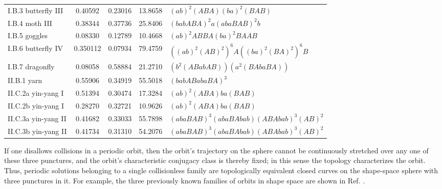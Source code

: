 \documentclass[twocolumn,showpacs,showkeys,preprintnumbers,amsmath,amssymb]{revtex4}
\begin{document}
\begin{table}[tbh]
\begin{center}
\begin{tabular}{lc@{\hskip 0.1in}c@{\hskip 0.1in}c@{\hskip 0.1in}l}
I.B.3 butterfly III & 0.40592 & 0.23016 & 13.8658 & $(ab)^2(ABA)(ba)^2(BAB)$ \\ %
I.B.4 moth III & 0.38344 & 0.37736 & 25.8406 & $(babABA)^2 a (abaBAB)^2 b$ \\ %
I.B.5 goggles & 0.08330 & 0.12789 & 10.4668 &  $(ab)^2 ABBA (ba)^2 BAAB$ \\ %
I.B.6 butterfly IV & 0.350112 & 0.07934 & 79.4759 & $((ab)^2 (AB)^2)^6 A((ba)^2 (BA)^2)^6 B$ \\ %
I.B.7 dragonfly & 0.08058 & 0.58884 & 21.2710 & $(b^2(ABabAB))(a^2(BAbaBA))$ \\ %
\hline
II.B.1 yarn & 0.55906 & 0.34919 & 55.5018 & $(babABabaBA)^3$ \\ %
II.C.2a yin-yang I & 0.51394 & 0.30474 & 17.3284 & $(ab)^2(ABA)ba(BAB)$ \\ %
II.C.2b yin-yang I & 0.28270 & 0.32721 & 10.9626 & $(ab)^2(ABA)ba(BAB)$ \\ %
II.C.3a yin-yang II & 0.41682  & 0.33033 & 55.7898 & $(abaBAB)^3 (abaBAbab)(ABAbab)^3 (AB)^2$  \\ %
II.C.3b yin-yang II & 0.41734  & 0.31310 & 54.2076 & $(abaBAB)^3 (abaBAbab)(ABAbab)^3 (AB)^2$  \\ %
\hline
\hline
\end{tabular}
\label{tab:drcc2n}
\end{center}
\end{table}

If one disallows collisions in a periodic orbit, then the orbit's trajectory 
on the sphere cannot be continuously stretched over any one of these three 
punctures, and the orbit's characteristic conjugacy class is thereby fixed; 
in this sense the topology characterizes the orbit.
Thus, periodic solutions belonging to a single collisionless family are topologically 
equivalent closed curves on the shape-space sphere with three punctures in it. 
For example, the three previously known families of orbits in shape space are shown in
Ref. \cite{Suvakov:2012b}.

\end{document}
